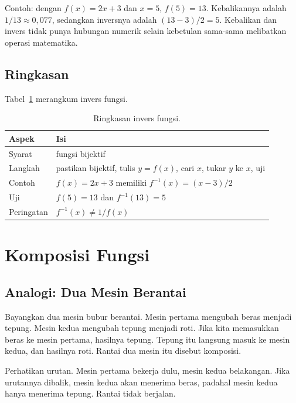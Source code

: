 \documentclass[11pt,a4paper]{article}
\begin{document}
Contoh: dengan $f(x)=2x+3$ dan $x=5$, $f(5)=13$. Kebalikannya adalah $1/13 \approx 0{,}077$, sedangkan inversnya adalah $(13-3)/2=5$. Kebalikan dan invers tidak punya hubungan numerik selain kebetulan sama-sama melibatkan operasi matematika.

\subsection{Ringkasan}

Tabel~\ref{tab:invers} merangkum invers fungsi.

\begin{table}[H]
	\centering
	\caption{Ringkasan invers fungsi.}
	\label{tab:invers}
	\small
	\begin{tabularx}{\textwidth}{l X}
		\toprule
		Aspek      & Isi                                                                \\
		\midrule
		Syarat     & fungsi bijektif                                                    \\
		Langkah    & pastikan bijektif, tulis $y=f(x)$, cari $x$, tukar $y$ ke $x$, uji \\
		Contoh     & $f(x)=2x+3$ memiliki $f^{-1}(x)=(x-3)/2$                           \\
		Uji        & $f(5)=13$ dan $f^{-1}(13)=5$                                       \\
		Peringatan & $f^{-1}(x) \ne 1/f(x)$                                             \\
		\bottomrule
	\end{tabularx}
\end{table}

\section{Komposisi Fungsi}

\subsection{Analogi: Dua Mesin Berantai}

Bayangkan dua mesin bubur berantai. Mesin pertama mengubah beras menjadi tepung. Mesin kedua mengubah tepung menjadi roti. Jika kita memasukkan beras ke mesin pertama, hasilnya tepung. Tepung itu langsung masuk ke mesin kedua, dan hasilnya roti. Rantai dua mesin itu disebut komposisi.

Perhatikan urutan. Mesin pertama bekerja dulu, mesin kedua belakangan. Jika urutannya dibalik, mesin kedua akan menerima beras, padahal mesin kedua hanya menerima tepung. Rantai tidak berjalan.
\end{document}
